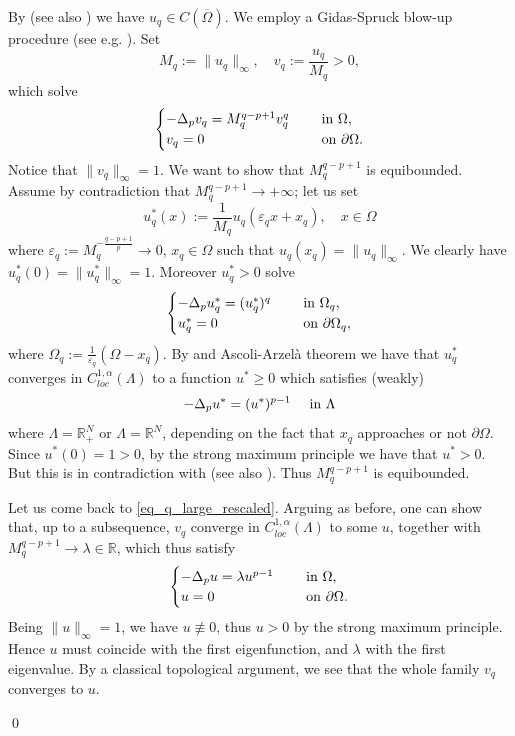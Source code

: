 \documentclass[11pt, reqno]{amsart}
\theoremstyle{definition}
\numberwithin{equation}{section}
\newcommand{\R}{\mathbb{R}}
\newcommand{\nequiv}{\not \equiv}
\def\eps{\varepsilon}
\def\norm#1{\|#1\|}
\renewenvironment{proof}[1][\proofname]{\medskip \noindent {\bfseries #1. }}{\qed \bigskip}
\begin{document}
\begin{proof}
By \cite[Corollary 4.2]{Tru67} (see also \cite[Corollary 3.7]{CaDe04}) we have $u_q \in C(\overline{\Omega})$. 
We employ a Gidas-Spruck blow-up procedure (see e.g. \cite{AzCl02}).
Set
$$M_q:= \norm{u_q}_{\infty}, \quad v_q:= \frac{u_q}{M_q}>0,$$
which solve
\begin{equation}\label{eq_q_large_rescaled}
\begin{cases}
-\Delta_p v_q = M_q^{q-p+1} v_q^{q} & \quad \hbox{ in $\Omega$},\\ 
v_q =0 & \quad \hbox{ on $\partial \Omega$}.
\end{cases}
\end{equation}
Notice that $\norm{v_q}_{\infty}=1$. We want to show that $M_q^{q-p+1} $ is equibounded. 
Assume by contradiction that $M_q^{q-p+1} \to +\infty$; let us set
$$u^*_q(x):= \frac{1}{M_q} u_q(\eps_q x +x_q), \quad x \in \Omega$$
where $\eps_q:=M_q^{-\frac{q-p+1}{p}} \to 0$, $x_q \in \Omega$ such that $u_q(x_q) = \norm{u_q}_{\infty}$.
We clearly have $u^*_q(0) = \norm{u^*_q}_{\infty}=1$. 
Moreover $u^*_q >0$ solve
$$\begin{cases}
-\Delta_p u^*_q = (u^*_q)^{q} & \quad \hbox{ in $\Omega_q$},\\ 
u^*_q =0 & \quad \hbox{ on $\partial \Omega_q$,}
\end{cases}$$
where $\Omega_q:= \frac{1}{\eps_q} (\Omega - x_q)$.
By \cite{Dib83, Tol84} and Ascoli-Arzelà theorem we have that $u^*_q$ converges in $C^{1,\alpha}_{loc}(\Lambda)$ to a function $u^* \geq 0$ which satisfies (weakly)
$$-\Delta_p u^* = (u^*)^{p-1} \quad \hbox{ in $\Lambda$}$$
where $\Lambda = \R^N_+$ or $\Lambda = \R^N$, depending on the fact that $x_q$ approaches or not $\partial \Omega$. 
Since $u^*(0)=1>0$, by the strong maximum principle \cite[Theorem 5]{Vaz84} we have that $u^*>0$.
But this is in contradiction with \cite[Lemma 2.1]{ILS08} (see also \cite[Theorem II]{SeZo02}). 
Thus $M_q^{q-p+1} $ is equibounded.

Let us come back to \eqref{eq_q_large_rescaled}. 
Arguing as before, one can show that, up to a subsequence, $v_q$ converge in $C^{1,\alpha}_{loc}(\Lambda)$ to some $u$, together with $M_q^{q-p+1} \to \lambda \in \R$, which thus satisfy
$$\begin{cases}
-\Delta_p u = \lambda u^{p-1} & \quad \hbox{ in $\Omega$},\\ 
u =0 & \quad \hbox{ on $\partial \Omega$}.
\end{cases}$$
Being $\norm{u}_{\infty}=1$, we have $u \nequiv 0$, thus $u >0$ by the strong maximum principle. Hence $u$ must coincide with the first eigenfunction, and $\lambda$ with the first eigenvalue. 
By a classical topological argument, we see that the whole family $v_q$ converges to $u$.


\end{proof}
\end{document}
